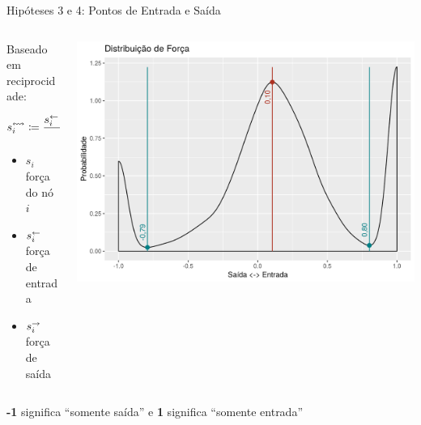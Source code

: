 \documentclass[10pt, hyperref={pdfpagelabels=false, unicode=true}, aspectratio=169]{beamer}
\begin{document}
{
\begin{frame}[c, label=hipotese-pontos-entrada-e-saida]{Hipóteses 3 e 4: Pontos de Entrada e Saída}
  \begin{center}
    \begin{columns}[onlytextwidth]
      \begin{column}{0.5\textwidth}
        \large
        Baseado em \alert{reciprocidade}:
        
        \normalsize
        \begin{equation*}
          s_i^\leftrightsquigarrow \coloneqq \frac{s_i^\leftarrow - s_i^\rightarrow}{s_i}
        \end{equation*}
        
        \begin{itemize}
          \item[] $s_i$ força do nó $i$
          \item[] $s_i^\leftarrow$ força de entrada
          \item[] $s_i^\rightarrow$ força de saída
        \end{itemize}
      \end{column}
    
      \begin{column}{0.5\textwidth}
        \includegraphics[width=\textwidth]{distribuicao-de-forca}
      \end{column}
    \end{columns}
  
    \vspace{\baselineskip}
  
    \textbf{-1} significa \enquote{somente saída} e \textbf{1} significa \enquote{somente entrada}
  \end{center}
\end{frame}
}
\end{document}
